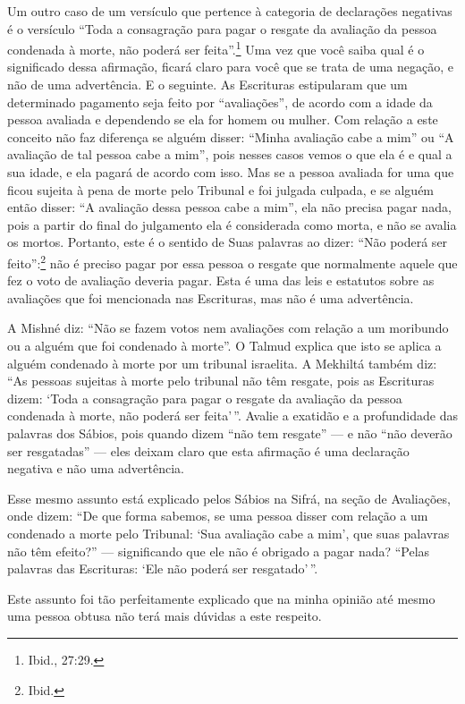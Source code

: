 Um outro caso de um versículo que pertence à categoria de declarações
negativas é o versículo ``Toda a consagração para pagar o resgate da
avaliação da pessoa condenada à morte, não poderá ser feita''.\footnote{Ibid.,
27:29.} Uma vez que você saiba qual é o significado dessa afirmação,
ficará claro para você que se trata de uma negação, e não de uma
advertência. E o seguinte. As Escrituras estipularam que um determinado
pagamento seja feito por ``avaliações'', de acordo com a idade da pessoa
avaliada e dependendo se ela for homem ou mulher. Com relação a este
conceito não faz diferença se alguém disser: ``Minha avaliação cabe a
mim'' ou ``A avaliação de tal pessoa cabe a mim'', pois nesses casos
vemos o que ela é e qual a sua idade, e ela pagará de acordo com isso.
Mas se a pessoa avaliada for uma que ficou sujeita à pena de morte pelo
Tribunal e foi julgada culpada, e se alguém então disser: ``A avaliação
dessa pessoa cabe a mim'', ela não precisa pagar nada, pois a partir do
final do julgamento ela é considerada como morta, e não se avalia os
mortos. Portanto, este é o sentido de Suas palavras ao dizer: ``Não
poderá ser feito'':\footnote{Ibid.} não é preciso pagar por essa pessoa o
resgate que normalmente aquele que fez o voto de avaliação deveria
pagar. Esta é uma das leis e estatutos sobre as avaliações que foi
mencionada nas Escrituras, mas não é uma advertência.

A Mishné diz: ``Não se fazem votos nem avaliações com relação a um
moribundo ou a alguém que foi condenado à morte''. O Talmud explica que
isto se aplica a alguém condenado à morte por um tribunal israelita. A
Mekhiltá também diz: ``As pessoas sujeitas à morte pelo tribunal não têm
resgate, pois as Escrituras dizem: `Toda a consagração para pagar o
resgate da avaliação da pessoa condenada à morte, não poderá ser
feita'\,''. Avalie a exatidão e a profundidade das palavras dos Sábios,
pois quando dizem ``não tem resgate'' --- e não ``não deverão ser
resgatadas'' --- eles deixam claro que esta afirmação é uma declaração
negativa e não uma advertência.

Esse mesmo assunto está explicado pelos Sábios na Sifrá, na seção de
Avaliações, onde dizem: ``De que forma sabemos, se uma pessoa disser com
relação a um condenado a morte pelo Tribunal: `Sua avaliação cabe a
mim', que suas palavras não têm efeito?'' --- significando que ele não é
obrigado a pagar nada? ``Pelas palavras das Escrituras: `Ele não poderá
ser resgatado'\,''.

Este assunto foi tão perfeitamente explicado que na minha opinião até
mesmo uma pessoa obtusa não terá mais dúvidas a este respeito.

